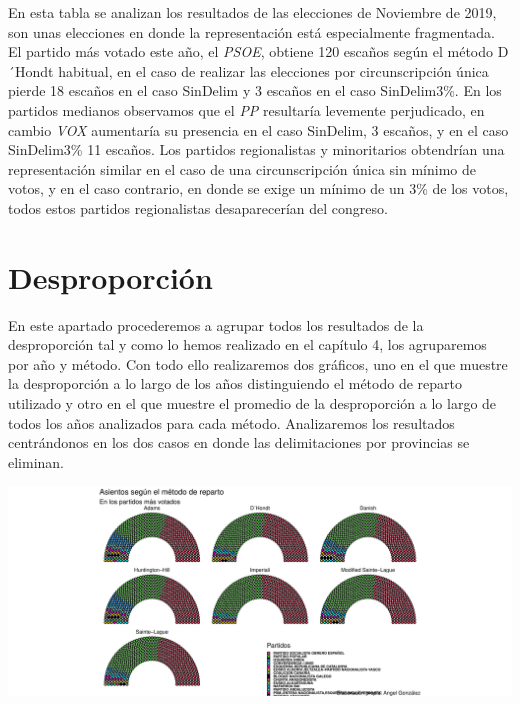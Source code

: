 \documentclass[12pt,a4paper,]{book}
\numberwithin{dummy}{section}
\theoremstyle{ocrenumbox}
\theoremstyle{blacknumex}
\theoremstyle{blacknumbox}
\theoremstyle{ocrenum}
\theoremstyle{ocrenum}
\begin{document}
En esta tabla se analizan los resultados de las elecciones de Noviembre
de 2019, son unas elecciones en donde la representación está
especialmente fragmentada. El partido más votado este año, el
\emph{PSOE}, obtiene 120 escaños según el método D´Hondt habitual, en el
caso de realizar las elecciones por circunscripción única pierde 18
escaños en el caso SinDelim y 3 escaños en el caso SinDelim3\%. En los
partidos medianos observamos que el \emph{PP} resultaría levemente
perjudicado, en cambio \emph{VOX} aumentaría su presencia en el caso
SinDelim, 3 escaños, y en el caso SinDelim3\% 11 escaños. Los partidos
regionalistas y minoritarios obtendrían una representación similar en el
caso de una circunscripción única sin mínimo de votos, y en el caso
contrario, en donde se exige un mínimo de un 3\% de los votos, todos
estos partidos regionalistas desaparecerían del congreso.

\hypertarget{desproporciuxf3n-15}{%
\section{Desproporción}\label{desproporciuxf3n-15}}

En este apartado procederemos a agrupar todos los resultados de la
desproporción tal y como lo hemos realizado en el capítulo 4, los
agruparemos por año y método. Con todo ello realizaremos dos gráficos,
uno en el que muestre la desproporción a lo largo de los años
distinguiendo el método de reparto utilizado y otro en el que muestre el
promedio de la desproporción a lo largo de todos los años analizados
para cada método. Analizaremos los resultados centrándonos en los dos
casos en donde las delimitaciones por provincias se eliminan.

\begin{center}\includegraphics[width=1\linewidth]{figurasR/unnamed-chunk-133-1} \end{center}
\end{document}
